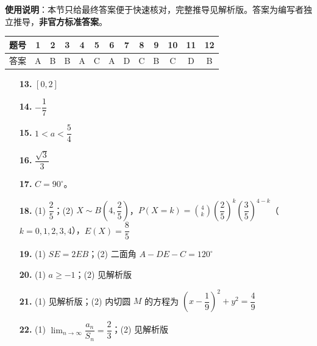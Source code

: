 
\begin{gknotice}
\textbf{使用说明}：本节只给最终答案便于快速核对，完整推导见解析版。答案为编写者独立推导，\textbf{非官方标准答案}。
\end{gknotice}

\begin{center}\begin{tabular}{ccccccccccccc}
\toprule
题号 & 1 & 2 & 3 & 4 & 5 & 6 & 7 & 8 & 9 & 10 & 11 & 12 \\
\midrule
答案 & A & B & B & A & C & A & D & C & B & C & D & B \\
\bottomrule
\end{tabular}\end{center}

\begin{itemize}[leftmargin=2.6em]
  \item[\textbf{13.}] $[0,2]$
  \item[\textbf{14.}] $-\dfrac17$
  \item[\textbf{15.}] $1<a<\dfrac54$
  \item[\textbf{16.}] $\dfrac{\sqrt3}{3}$
\end{itemize}

\begin{itemize}[leftmargin=2.6em]
  \item[\textbf{17.}] $C=90^\circ$。
  \item[\textbf{18.}] (1) $\dfrac25$；(2) $X\sim B\left(4,\dfrac25\right)$，$P(X=k)=\binom4k\left(\dfrac25\right)^k\left(\dfrac35\right)^{4-k}$（$k=0,1,2,3,4$），$E(X)=\dfrac85$
  \item[\textbf{19.}] (1) $SE=2EB$；(2) 二面角 $A-DE-C=120^\circ$
  \item[\textbf{20.}] (1) $a\geq-1$；(2) 见解析版
  \item[\textbf{21.}] (1) 见解析版；(2) 内切圆 $M$ 的方程为 $\left(x-\dfrac19\right)^2+y^2=\dfrac49$
  \item[\textbf{22.}] (1) $\displaystyle\lim_{n\to\infty}\dfrac{a_n}{S_n}=\dfrac23$；(2) 见解析版
\end{itemize}
